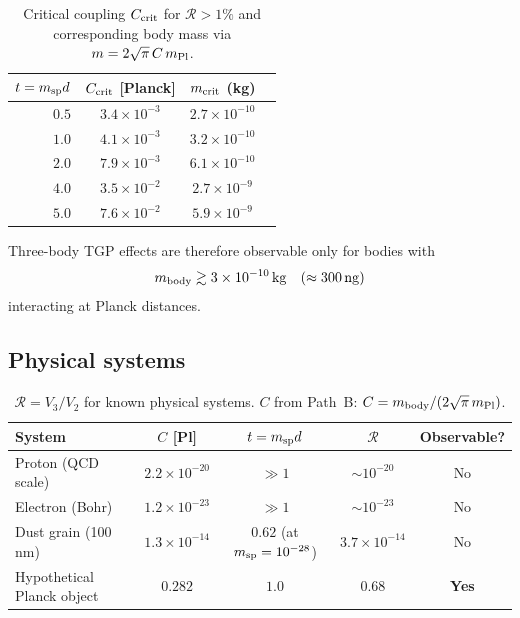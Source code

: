 \begin{table}[h]
\centering
\caption{Critical coupling $C_{\rm crit}$ for $\mathcal{R}>1\%$ and
corresponding body mass via $m=2\sqrt{\pi}\,C\,m_{\rm Pl}$.}
\label{tab:ccrit}
\begin{tabular}{rccc}
\hline
$t=m_{\rm sp}d$ & $C_{\rm crit}$ [Planck] & $m_{\rm crit}$ (kg) & \\
\hline
$0.5$ & $3.4\times10^{-3}$ & $2.7\times10^{-10}$ & \\
$1.0$ & $4.1\times10^{-3}$ & $3.2\times10^{-10}$ & \\
$2.0$ & $7.9\times10^{-3}$ & $6.1\times10^{-10}$ & \\
$4.0$ & $3.5\times10^{-2}$ & $2.7\times10^{-9}$  & \\
$5.0$ & $7.6\times10^{-2}$ & $5.9\times10^{-9}$  & \\
\hline
\end{tabular}
\end{table}

\noindent
Three-body TGP effects are therefore observable only for bodies with
\begin{equation}
  m_{\rm body} \gtrsim 3\times10^{-10}\,{\rm kg}
  \quad(\approx 300\,{\rm ng})
\end{equation}
interacting at Planck distances.

\subsection{Physical systems}

\begin{table}[h]
\centering
\caption{$\mathcal{R}=V_3/V_2$ for known physical systems.
$C$ from Path~B: $C=m_{\rm body}/(2\sqrt{\pi}\,m_{\rm Pl})$.}
\label{tab:physical_systems}
\begin{tabular}{lcccc}
\hline
System & $C$ [Pl] & $t=m_{\rm sp}d$ & $\mathcal{R}$ & Observable? \\
\hline
Proton (QCD scale)   & $2.2\times10^{-20}$ & $\gg1$               & $\sim10^{-20}$  & No \\
Electron (Bohr)      & $1.2\times10^{-23}$ & $\gg1$               & $\sim10^{-23}$  & No \\
Dust grain (100 nm)  & $1.3\times10^{-14}$ & $0.62$ (at $m_{\rm sp}=10^{-28}$) & $3.7\times10^{-14}$ & No \\
Hypothetical Planck object & $0.282$ & $1.0$ & $0.68$  & \textbf{Yes} \\
\hline
\end{tabular}
\end{table}

